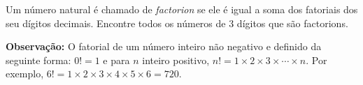 Um número natural é chamado de \textit{factorion} se ele é igual a soma dos fatoriais dos seu dígitos decimais.
Encontre todos os números de 3 dígitos que são factorions.

\textbf{Observação:} O fatorial de um número inteiro não negativo e definido da seguinte forma:
$0! = 1$ e para $n$ inteiro positivo, $n! = 1 \times 2 \times 3 \times \cdots \times n$. Por exemplo, $6! = 1 \times 2 \times 3 \times 4 \times 5 \times 6 = 720$.
